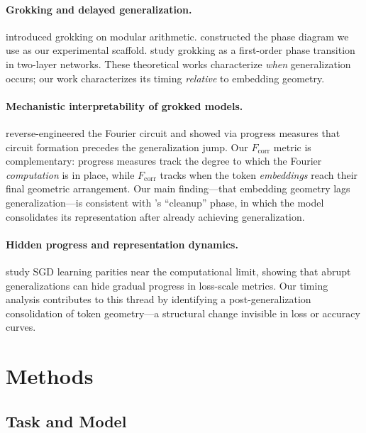 \documentclass{article}
\newcommand{\fcorr}{F_{\mathrm{corr}}}
\begin{document}
\paragraph{Grokking and delayed generalization.}
\citet{power2022grokking} introduced grokking on modular arithmetic.
\citet{liu2022towards} constructed the phase diagram we use as our
experimental scaffold.
\citet{rubin2024grokking} study grokking as a first-order phase
transition in two-layer networks.
These theoretical works characterize \emph{when} generalization
occurs; our work characterizes its timing \emph{relative} to
embedding geometry.

\paragraph{Mechanistic interpretability of grokked models.}
\citet{nanda2023progress} reverse-engineered the Fourier circuit and
showed via progress measures that circuit formation precedes the
generalization jump.
Our $\fcorr$ metric is complementary: progress measures track the
degree to which the Fourier \emph{computation} is in place, while
$\fcorr$ tracks when the token \emph{embeddings} reach their final
geometric arrangement.
Our main finding---that embedding geometry lags generalization---is
consistent with \citeauthor{nanda2023progress}'s ``cleanup'' phase,
in which the model consolidates its representation after already
achieving generalization.

\paragraph{Hidden progress and representation dynamics.}
\citet{barak2022hidden} study SGD learning parities near the
computational limit, showing that abrupt generalizations can hide
gradual progress in loss-scale metrics.
Our timing analysis contributes to this thread by identifying a
post-generalization consolidation of token geometry---a structural
change invisible in loss or accuracy curves.

\section{Methods}
\label{sec:methods}

\subsection{Task and Model}
\end{document}
